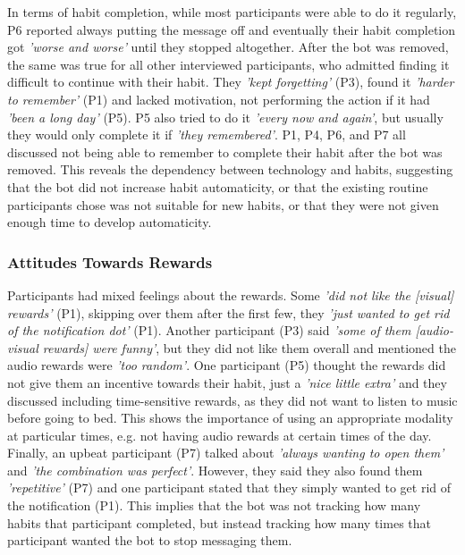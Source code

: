 \documentclass{scaffold/sigchi}
\begin{document}
In terms of habit completion, while most participants were able to do it regularly, P6 reported always putting the message off and eventually their habit completion got \textit{'worse and worse'} until they stopped altogether. After the bot was removed, the same was true for all other interviewed participants, who admitted finding it difficult to continue with their habit. They \textit{'kept forgetting'} (P3), found it \textit{'harder to remember'} (P1) and lacked motivation, not performing the action if it had \textit{'been a long day'} (P5). P5 also tried to do it \textit{'every now and again'}, but usually they would only complete it if \textit{'they remembered'}. P1, P4, P6, and P7 all discussed not being able to remember to complete their habit after the bot was removed. This reveals the dependency between technology and habits, suggesting that the bot did not increase habit automaticity, or that the existing routine participants chose was not suitable for new habits, or that they were not given enough time to develop automaticity.

\subsubsection{Attitudes Towards Rewards}
Participants had mixed feelings about the rewards. Some \textit{'did not like the [visual] rewards'} (P1), skipping over them after the first few, they \textit{'just wanted to get rid of the notification dot'} (P1). Another participant (P3) said \textit{'some of them [audio-visual rewards] were funny'}, but they did not like them overall and mentioned the audio rewards were \textit{'too random'}. One participant (P5) thought the rewards did not give them an incentive towards their habit, just a \textit{'nice little extra'} and they discussed including time-sensitive rewards, as they did not want to listen to music before going to bed. This shows the importance of using an appropriate modality at particular times, e.g. not having audio rewards at certain times of the day. Finally, an upbeat participant (P7) talked about \textit{'always wanting to open them'} and \textit{'the combination was perfect'}. However, they said they also found them \textit{'repetitive'} (P7) and one participant stated that they simply wanted to get rid of the notification (P1). This implies that the bot was not tracking how many habits that participant completed, but instead tracking how many times that participant wanted the bot to stop messaging them.
\end{document}
